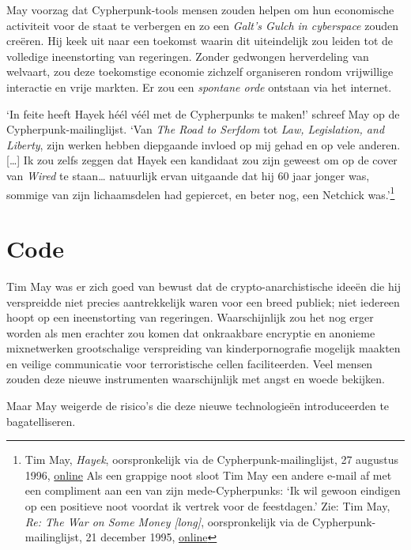 \documentclass[
  a5paper,
  smalldemyvopaper,11pt,twoside,onecolumn,openright,extrafontsizes,
hidelinks]{memoir}
\begin{document}
May voorzag dat Cypherpunk-tools mensen zouden helpen om hun economische
activiteit voor de staat te verbergen en zo een \emph{Galt's Gulch in
cyberspace} zouden creëren. Hij keek uit naar een toekomst waarin dit
uiteindelijk zou leiden tot de volledige ineenstorting van regeringen.
Zonder gedwongen herverdeling van welvaart, zou deze toekomstige
economie zichzelf organiseren rondom vrijwillige interactie en vrije
markten. Er zou een \emph{spontane orde} ontstaan via het internet.

`In feite heeft Hayek héél véél met de Cypherpunks te maken!' schreef
May op de Cypherpunk-mailinglijst. `Van \emph{The Road to Serfdom} tot
\emph{Law, Legislation, and Liberty}, zijn werken hebben diepgaande
invloed op mij gehad en op vele anderen. {[}\ldots{]} Ik zou zelfs
zeggen dat Hayek een kandidaat zou zijn geweest om op de cover van
\emph{Wired} te staan\ldots{} natuurlijk ervan uitgaande dat hij 60 jaar
jonger was, sommige van zijn lichaamsdelen had gepiercet, en beter nog,
een Netchick was.'\footnote{Tim May, \emph{Hayek}, oorspronkelijk via de
  Cypherpunk-mailinglijst, 27 augustus 1996,
  \href{https://cypherpunks.venona.com/date/1996/08/msg02102.html}{online}
  Als een grappige noot sloot Tim May een andere e-mail af met een
  compliment aan een van zijn mede-Cypherpunks: `Ik wil gewoon eindigen
  op een positieve noot voordat ik vertrek voor de feestdagen.' Zie: Tim
  May, \emph{Re: The War on Some Money {[}long{]}}, oorspronkelijk via
  de Cypherpunk-mailinglijst, 21 december 1995,
  \href{https://cypherpunks.venona.com/date/1995/12/msg01044.html}{online}}

\section{Code}\label{code}

Tim May was er zich goed van bewust dat de crypto-anarchistische ideeën
die hij verspreidde niet precies aantrekkelijk waren voor een breed
publiek; niet iedereen hoopt op een ineenstorting van regeringen.
Waarschijnlijk zou het nog erger worden als men erachter zou komen dat
onkraakbare encryptie en anonieme mixnetwerken grootschalige
verspreiding van kinderpornografie mogelijk maakten en veilige
communicatie voor terroristische cellen faciliteerden. Veel mensen
zouden deze nieuwe instrumenten waarschijnlijk met angst en woede
bekijken.

Maar May weigerde de risico's die deze nieuwe technologieën
introduceerden te bagatelliseren.
\end{document}
